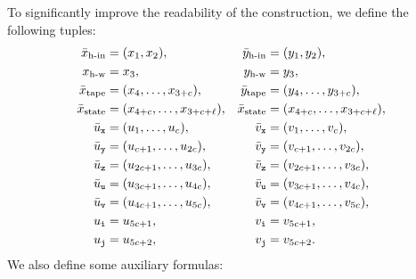 To significantly improve the readability of the construction, we define the following tuples:
\begin{equation*}
\begin{aligned}
	\bar{x}_{\text{h-in}} &= (x_1,x_2), \\
	x_{\text{h-w}} &= x_3, \\
	\bar{x}_{\text{tape}} &= (x_4,\ldots,x_{3+c}),\\
	\bar{x}_{\text{state}} &= (x_{4+c},\ldots,x_{3+c+\ell}),\\
	\bar{u}_{\mathtt{x}} &= (u_1,\ldots,u_c),\\
	\bar{u}_{\mathtt{y}} &= (u_{c+1},\ldots,u_{2c}),\\
	\bar{u}_{\mathtt{z}} &= (u_{2c+1},\ldots,u_{3c}),\\
	\bar{u}_{\mathtt{u}} &= (u_{3c+1},\ldots,u_{4c}),\\
	\bar{u}_{\mathtt{v}} &= (u_{4c+1},\ldots,u_{5c}),\\
	u_{\mathtt{i}} &= u_{5c+1},\\
	u_{\mathtt{j}} &= u_{5c+2},
\end{aligned}
\hspace{1em}
\begin{aligned}
	\bar{y}_{\text{h-in}} &= (y_1,y_2), \\
	y_{\text{h-w}} &= y_3, \\
	\bar{y}_{\text{tape}} &= (y_4,\ldots,y_{3+c}),\\
	\bar{x}_{\text{state}} &= (x_{4+c},\ldots,x_{3+c+\ell}),\\
	\bar{v}_{\mathtt{x}} &= (v_1,\ldots,v_c),\\
	\bar{v}_{\mathtt{y}} &= (v_{c+1},\ldots,v_{2c}),\\
	\bar{v}_{\mathtt{z}} &= (v_{2c+1},\ldots,v_{3c}),\\
	\bar{v}_{\mathtt{u}} &= (v_{3c+1},\ldots,v_{4c}),\\
	\bar{v}_{\mathtt{v}} &= (v_{4c+1},\ldots,v_{5c}),\\
	v_{\mathtt{i}} &= v_{5c+1},\\
	v_{\mathtt{j}} &= v_{5c+2}.
\end{aligned}
\end{equation*}
We also define some auxiliary formulas:

